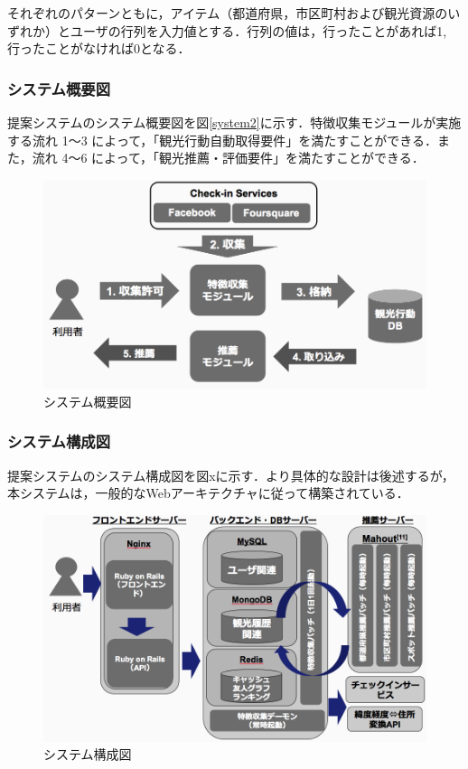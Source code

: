 \documentclass{jsarticle}
\begin{document}
それぞれのパターンともに，アイテム（都道府県，市区町村および観光資源のいずれか）とユーザの行列を入力値とする．行列の値は，行ったことがあれば1, 行ったことがなければ0となる．

\subsubsection{システム概要図}

提案システムのシステム概要図を図\ref{system2}に示す．特徴収集モジュールが実施する流れ 1〜3 によって，「観光行動自動取得要件」を満たすことができる．また，流れ 4〜6 によって，「観光推薦・評価要件」を満たすことができる．

\begin{figure}[h!]
\begin{center}
\includegraphics[width=12.0cm]{./image/system2.png}
\caption{システム概要図}
\label{system1}
\end{center}
\end{figure}

\subsubsection{システム構成図}

提案システムのシステム構成図を図xに示す．より具体的な設計は後述するが，本システムは，一般的なWebアーキテクチャに従って構築されている．

\begin{figure}[!ht]
\begin{center}
\includegraphics[width=12.0cm]{./image/system1.png}
\caption{システム構成図}
\label{system1}
\end{center}
\end{figure}
\end{document}
